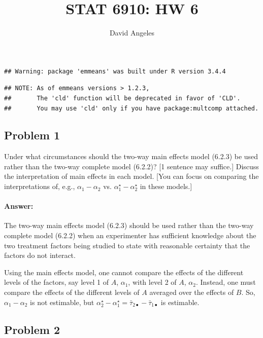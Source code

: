 \documentclass[12pt,]{article}
\title{STAT 6910: HW 6}
\author{David Angeles}
\date{}
\let\oldparagraph\paragraph
\renewcommand{\paragraph}[1]{\oldparagraph{#1}\mbox{}}
\begin{document}
\maketitle

\begin{verbatim}
## Warning: package 'emmeans' was built under R version 3.4.4
\end{verbatim}

\begin{verbatim}
## NOTE: As of emmeans versions > 1.2.3,
##       The 'cld' function will be deprecated in favor of 'CLD'.
##       You may use 'cld' only if you have package:multcomp attached.
\end{verbatim}

\subsection{Problem 1}\label{problem-1}

Under what circumstances should the two-way main effects model (6.2.3)
be used rather than the two-way complete model (6.2.2)? {[}1 sentence
may suffice.{]} Discuss the interpretation of main effects in each
model. {[}You can focus on comparing the interpretations of, e.g.,
\(\alpha_1 - \alpha_2\) vs. \(\alpha_1^\star - \alpha_2^\star\) in these
models.{]}

\paragraph{Answer:}\label{answer}

The two-way main effects model (6.2.3) should be used rather than the
two-way complete model (6.2.2) when an experimenter has sufficient
knowledge about the two treatment factors being studied to state with
reasonable certainty that the factors do not interact.

Using the main effects model, one cannot compare the effects of the
different levels of the factors, say level 1 of \(A\), \(\alpha_1\),
with level 2 of \(A\), \(\alpha_2\). Instead, one must compare the
effects of the different levels of \(A\) averaged over the effects of
\(B\). So, \(\alpha_1-\alpha_2\) is not estimable, but
\(\alpha^\star_2-\alpha^\star_1=\bar{\tau}_{2\bullet}-\bar{\tau}_{1\bullet}\)
is estimable.

\subsection{Problem 2}\label{problem-2}
\end{document}
